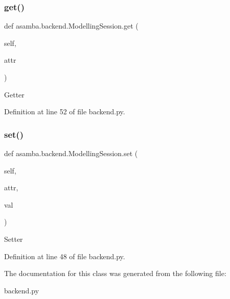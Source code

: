 \subsubsection{\texorpdfstring{get()}{get()}}
{\footnotesize\ttfamily def asamba.\+backend.\+Modelling\+Session.\+get (\begin{DoxyParamCaption}\item[{}]{self,  }\item[{}]{attr }\end{DoxyParamCaption})}

\begin{DoxyVerb}Getter \end{DoxyVerb}
 

Definition at line 52 of file backend.\+py.

\mbox{\label{classasamba_1_1backend_1_1_modelling_session_a83549fd610225e6edea77914b0f65f30}} 
\subsubsection{\texorpdfstring{set()}{set()}}
{\footnotesize\ttfamily def asamba.\+backend.\+Modelling\+Session.\+set (\begin{DoxyParamCaption}\item[{}]{self,  }\item[{}]{attr,  }\item[{}]{val }\end{DoxyParamCaption})}

\begin{DoxyVerb}Setter \end{DoxyVerb}
 

Definition at line 48 of file backend.\+py.



The documentation for this class was generated from the following file\+:\begin{DoxyCompactItemize}
\item 
backend.\+py\end{DoxyCompactItemize}
